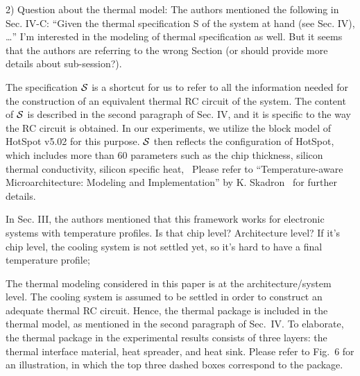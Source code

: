 \begin{reviewer}
2) Question about the thermal model: The authors mentioned the following in Sec. IV-C: ``Given the thermal specification S of the system at hand (see Sec. IV), \ldots'' I’m interested in the modeling of thermal specification as well. But it seems that the authors are referring to the wrong Section (or should provide more details about sub-session?).
\end{reviewer}
\begin{authors}
The specification $\mathcal{S}$ is a shortcut for us to refer to all the information needed for the construction of an equivalent thermal RC circuit of the system.
The content of $\mathcal{S}$ is described in the second paragraph of Sec. IV, and it is specific to the way the RC circuit is obtained.
In our experiments, we utilize the block model of HotSpot v5.02 for this purpose.
$\mathcal{S}$ then reflects the configuration of HotSpot, which includes more than 60 parameters such as the chip thickness, silicon thermal conductivity, silicon specific heat, \etc\ Please refer to ``Temperature-aware Microarchitecture: Modeling and Implementation'' by K. Skadron \etal\ for further details.



\end{authors}

\begin{reviewer}
In Sec. III, the authors mentioned that this framework works for electronic systems with temperature profiles. Is that chip level? Architecture level? If it’s chip level, the cooling system is not settled yet, so it’s hard to have a final temperature profile;
\end{reviewer}
\begin{authors}
The thermal modeling considered in this paper is at the architecture/system level.
The cooling system is assumed to be settled in order to construct an adequate thermal RC circuit.
Hence, the thermal package is included in the thermal model, as mentioned in the second paragraph of Sec.~IV.
To elaborate, the thermal package in the experimental results consists of three layers: the thermal interface material, heat spreader, and heat sink.
Please refer to Fig.~6 for an illustration, in which the top three dashed boxes correspond to the package.

\end{authors}

